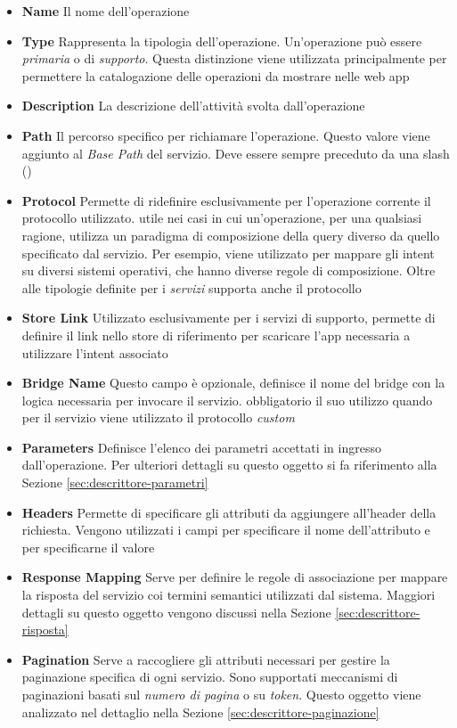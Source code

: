 \begin{itemize}
	\item \textbf{Name} Il nome dell'operazione
	\item \textbf{Type} Rappresenta la tipologia dell'operazione. Un'operazione può essere \emph{primaria} o di \emph{supporto}. Questa distinzione viene utilizzata principalmente per permettere la catalogazione delle operazioni da mostrare nelle web app
	\item \textbf{Description} La descrizione dell'attività svolta dall'operazione
	\item \textbf{Path} Il percorso specifico per richiamare l'operazione. Questo valore viene aggiunto al \emph{Base Path} del servizio. Deve essere sempre preceduto da una slash (\virgolette{/})
	\item \textbf{Protocol} Permette di ridefinire esclusivamente per l'operazione corrente il protocollo utilizzato. \upe utile nei casi in cui un'operazione, per una qualsiasi ragione, utilizza un paradigma di composizione della query diverso da quello specificato dal servizio. Per esempio, viene utilizzato per mappare gli intent su diversi sistemi operativi, che hanno diverse regole di composizione. Oltre alle tipologie definite per i \emph{servizi} supporta anche il protocollo 
	\item \textbf{Store Link} Utilizzato esclusivamente per i servizi di supporto, permette di definire il link nello store di riferimento per scaricare l'app necessaria a utilizzare l'intent associato
	\item \textbf{Bridge Name} Questo campo è opzionale, definisce il nome del bridge con la logica necessaria per invocare il servizio. \upe obbligatorio il suo utilizzo quando per il servizio viene utilizzato il protocollo \emph{custom}
	\item \textbf{Parameters} Definisce l'elenco dei parametri accettati in ingresso dall'operazione. Per ulteriori dettagli su questo oggetto si fa riferimento alla Sezione \ref{sec:descrittore-parametri}
	\item \textbf{Headers} Permette di specificare gli attributi da aggiungere all'header della richiesta. Vengono utilizzati i campi  per specificare il nome dell'attributo e  per specificarne il valore
	\item \textbf{Response Mapping} Serve per definire le regole di associazione per mappare la risposta del servizio coi termini semantici utilizzati dal sistema. Maggiori dettagli su questo oggetto vengono discussi nella Sezione \ref{sec:descrittore-risposta}
	\item \textbf{Pagination} Serve a raccogliere gli attributi necessari per gestire la paginazione specifica di ogni servizio. Sono supportati meccanismi di paginazioni basati sul \emph{numero di pagina} o su \emph{token}. Questo oggetto viene analizzato nel dettaglio nella Sezione \ref{sec:descrittore-paginazione}
\end{itemize}

